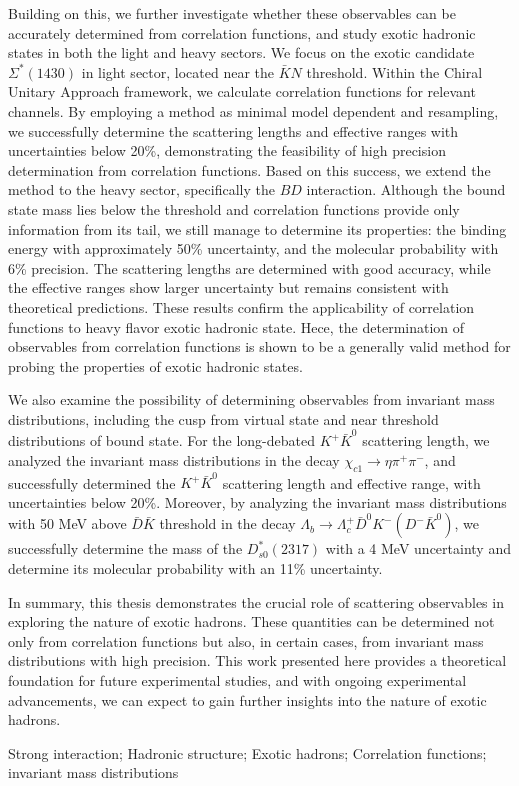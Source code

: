 Building on this, we further investigate whether these observables can be accurately determined from correlation functions, and study exotic hadronic states in both the light and heavy sectors.
We focus on the exotic candidate $\Sigma^{*}(1430)$ in light sector, located near the $\bar{K}N$ threshold.
Within the Chiral Unitary Approach framework, we calculate correlation functions for relevant channels.
By employing a method as minimal model dependent and resampling, we successfully determine the scattering lengths and effective ranges with uncertainties below 20\%, demonstrating the feasibility of high precision determination from correlation functions.
Based on this success, we extend the method to the heavy sector, specifically the $BD$ interaction.
Although the bound state mass lies below the threshold and correlation functions provide only information from its tail, we still manage to determine its properties: the binding energy with approximately 50\% uncertainty, and the molecular probability with 6\% precision.
The scattering lengths are determined with good accuracy, while the effective ranges show larger uncertainty but remains consistent with theoretical predictions.
These results confirm the applicability of correlation functions to heavy flavor exotic hadronic state.
Hece, the determination of observables from correlation functions is shown to be a generally valid method for probing the properties of exotic hadronic states.

We also examine the possibility of determining observables from invariant mass distributions, including the cusp from virtual state and near threshold distributions of bound state.
For the long-debated $K^{+}\bar{K}^{0}$ scattering length, we analyzed the invariant mass distributions in the decay $\chi_{c1}\to \eta\pi^{+}\pi^{-}$, and successfully determined the $K^{+}\bar{K}^{0}$ scattering length and effective range, with uncertainties below 20\%.
Moreover, by analyzing the invariant mass distributions with 50 MeV above $\bar{D}\bar{K}$ threshold in the decay $\Lambda_{b}\to \Lambda_{c}^{+}\bar{D}^{0}K^{-}(D^{-}\bar{K}^{0})$, we successfully determine the mass of the $D^{*}_{s0}(2317)$ with a 4 MeV uncertainty and determine its molecular probability with an 11\% uncertainty.

In summary, this thesis demonstrates the crucial role of scattering observables in exploring the nature of exotic hadrons.
These quantities can be determined not only from correlation functions but also, in certain cases, from invariant mass distributions with high precision.
This work presented here provides a theoretical foundation for future experimental studies, and with ongoing experimental advancements, we can expect to gain further insights into the nature of exotic hadrons.


\vspace{0.30cm}
 {Strong interaction; Hadronic structure; Exotic hadrons; Correlation functions; invariant mass distributions}
